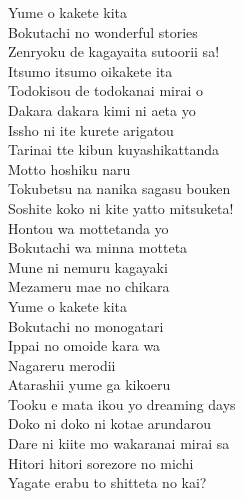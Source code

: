 \def\songtitle{WONDERFUL STORIES}
\def\songcomment{Season 2 Insert Song}
\def\songlyrics{Aki Hata}
\def\songwriter{Carlos K.}
\def\songarrange{EFFY}
   
\ifdefined\COMPLETE
\else
	
	
\fi
\thispagestyle{song}

{\small{}}
\begin{multicols}{2}
Yume o kakete kita\\
Bokutachi no wonderful stories\\
Zenryoku de kagayaita sutoorii sa!\\

Itsumo itsumo oikakete ita\\
Todokisou de todokanai mirai o\\
Dakara dakara kimi ni aeta yo\\
Issho ni ite kurete arigatou\\

Tarinai tte kibun kuyashikattanda\\
Motto hoshiku naru\\
Tokubetsu na nanika sagasu bouken\\
Soshite koko ni kite yatto mitsuketa!\\

Hontou wa mottetanda yo\\
Bokutachi wa minna motteta\\
Mune ni nemuru kagayaki\\
Mezameru mae no chikara\\
Yume o kakete kita\\
Bokutachi no monogatari\\
Ippai no omoide kara wa\\
Nagareru merodii\\
Atarashii yume ga kikoeru\\
Tooku e mata ikou yo dreaming days\\

Doko ni doko ni kotae arundarou\\
Dare ni kiite mo wakaranai mirai sa\\
Hitori hitori sorezore no michi\\
Yagate erabu to shitteta no kai?\\


\end{multicols}
